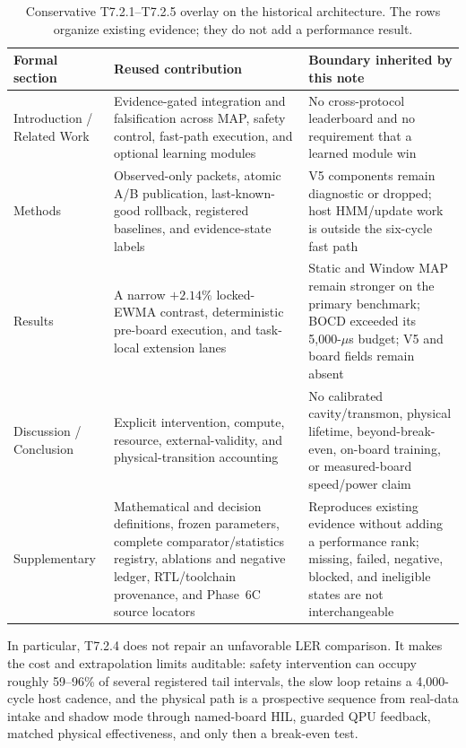 \documentclass[11pt]{article}
\begin{document}
\begin{table}[htbp]
\centering
\small
\begin{tabularx}{\textwidth}{@{}p{} X X@{}}
\toprule
Formal section & Reused contribution & Boundary inherited by this note \\
\midrule
Introduction / Related Work & Evidence-gated integration and falsification across MAP, safety control, fast-path execution, and optional learning modules & No cross-protocol leaderboard and no requirement that a learned module win \\
Methods & Observed-only packets, atomic A/B publication, last-known-good rollback, registered baselines, and evidence-state labels & V5 components remain diagnostic or dropped; host HMM/update work is outside the six-cycle fast path \\
Results & A narrow $+2.14\%$ locked-EWMA contrast, deterministic pre-board execution, and task-local extension lanes & Static and Window MAP remain stronger on the primary benchmark; BOCD exceeded its 5,000-$\mu$s budget; V5 and board fields remain absent \\
Discussion / Conclusion & Explicit intervention, compute, resource, external-validity, and physical-transition accounting & No calibrated cavity/transmon, physical lifetime, beyond-break-even, on-board training, or measured-board speed/power claim \\
Supplementary & Mathematical and decision definitions, frozen parameters, complete comparator/statistics registry, ablations and negative ledger, RTL/toolchain provenance, and Phase~6C source locators & Reproduces existing evidence without adding a performance rank; missing, failed, negative, blocked, and ineligible states are not interchangeable \\
\bottomrule
\end{tabularx}
\caption{Conservative T7.2.1--T7.2.5 overlay on the historical architecture.
The rows organize existing evidence; they do not add a performance result.}
\label{tab:oldnote-formal-paper-overlay}
\end{table}

In particular, T7.2.4 does not repair an unfavorable LER comparison.  It makes
the cost and extrapolation limits auditable: safety intervention can occupy
roughly 59--96\% of several registered tail intervals, the slow loop retains a
4,000-cycle host cadence, and the physical path is a prospective sequence from
real-data intake and shadow mode through named-board HIL, guarded QPU feedback,
matched physical effectiveness, and only then a break-even test.
\end{document}
